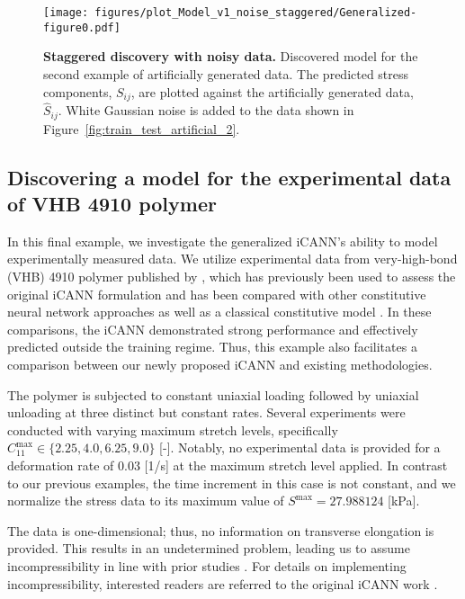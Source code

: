 %
\begin{figure}[h]
    \centering
    \texttt{[image: figures/plot\_Model\_v1\_noise\_staggered/Generalized-figure0.pdf]}
    \caption{\textbf{Staggered discovery with noisy data.} Discovered model for the second example of artificially generated data. The predicted stress components, $S_{ij}$, are plotted against the artificially generated data, $\hat{S}_{ij}$. White Gaussian noise is added to the data shown in Figure~\ref{fig:train_test_artificial_2}.}
    \label{fig:train_test_artificial_noisy_2}
\end{figure}
%
%
\FloatBarrier
\subsection{Discovering a model for the experimental data of VHB 4910 polymer}
\label{sec:Hossain2012}
%
In this final example, we investigate the generalized iCANN's ability to model experimentally measured data. 
We utilize experimental data from very-high-bond (VHB) 4910 polymer published by \citet{hossain2012}, which has previously been used to assess the original iCANN formulation \cite{holthusen2024} and has been compared with other constitutive neural network approaches \cite{AbdolaziziLinkaEtAl2023} as well as a classical constitutive model \cite{hossain2012}. 
In these comparisons, the iCANN demonstrated strong performance and effectively predicted outside the training regime. 
Thus, this example also facilitates a comparison between our newly proposed iCANN and existing methodologies.

The polymer is subjected to constant uniaxial loading followed by uniaxial unloading at three distinct but constant rates. 
Several experiments were conducted with varying maximum stretch levels, specifically $ C_{11}^{\text{max}} \in \{2.25, 4.0, 6.25, 9.0\} $ [-]. 
Notably, no experimental data is provided for a deformation rate of $ 0.03 $ [1/s] at the maximum stretch level applied. 
In contrast to our previous examples, the time increment in this case is not constant, and we normalize the stress data to its maximum value of $ S^{\text{max}} = 27.988124 $ [kPa].

The data is one-dimensional; thus, no information on transverse elongation is provided. 
This results in an undetermined problem, leading us to assume incompressibility in line with prior studies \cite{holthusen2024,holthusen2024PAMM,AbdolaziziLinkaEtAl2023}. 
For details on implementing incompressibility, interested readers are referred to the original iCANN work \cite{holthusen2024}.\newline

